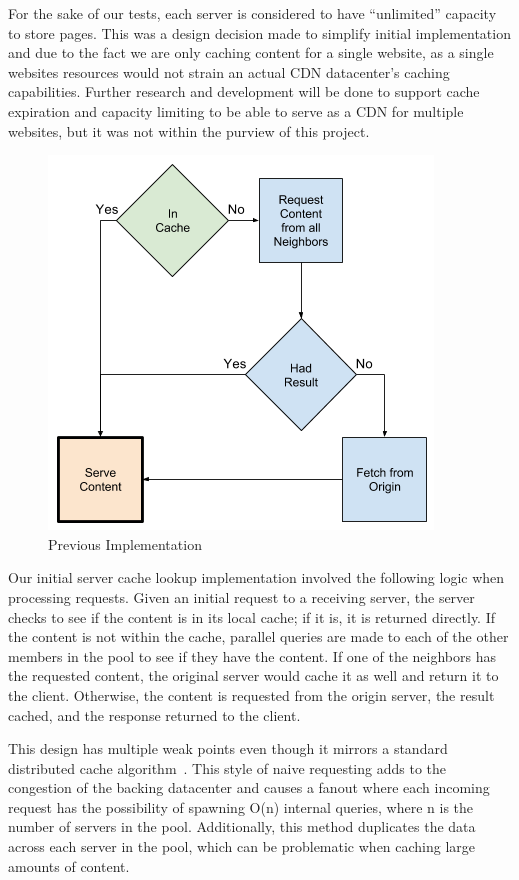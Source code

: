 \documentclass[conference]{IEEEtran}
\begin{document}
For the sake of our tests, each server is considered to have “unlimited” capacity to store pages.  This was a design decision made to simplify initial implementation and due to the fact we are only caching content for a single website, as a single websites resources would not strain an actual CDN datacenter’s caching capabilities.  Further research and development will be done to support cache expiration and capacity limiting to be able to serve as a CDN for multiple websites, but it was not within the purview of this project. 

\begin{figure}[!h]
	\centering
	\includegraphics[width=0.7\columnwidth]{figures/cache_logic_before.png}
	\caption{Previous Implementation}
\end{figure}

Our initial server cache lookup implementation involved the following logic when processing requests. Given an initial request to a receiving server, the server checks to see if the content is in its local cache; if it is, it is returned directly.  If the content is not within the cache, parallel queries are made to each of the other members in the pool to see if they have the content.  If one of the neighbors has the requested content, the original server would cache it as well and return it to the client. Otherwise, the content is requested from the origin server, the result cached, and the response returned to the client. 

This design has multiple weak points even though it mirrors a standard distributed cache algorithm~\cite{mao2012cache}.  This style of naive requesting adds to the congestion of the backing datacenter and causes a fanout where each incoming request has the possibility of spawning O(n) internal queries, where n is the number of servers in the pool.  Additionally, this method duplicates the data across each server in the pool, which can be problematic when caching large amounts of content.
\end{document}
